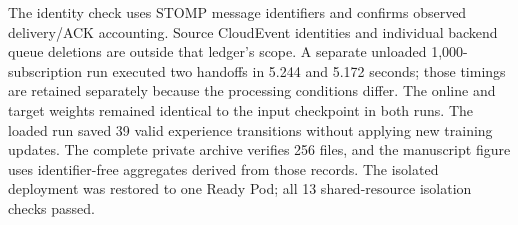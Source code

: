 The identity check uses STOMP message identifiers and confirms observed
delivery/ACK accounting. Source CloudEvent identities and individual backend
queue deletions are outside that ledger's scope. A separate unloaded
1,000-subscription run executed two handoffs in 5.244 and 5.172 seconds;
those timings are retained separately because the processing conditions
differ. The online and target weights remained identical to the input
checkpoint in both runs. The loaded run saved 39 valid experience transitions
without applying new training updates. The complete private archive verifies
256 files, and the manuscript figure uses identifier-free aggregates derived
from those records. The isolated deployment was restored to one Ready Pod;
all 13 shared-resource isolation checks passed.

\FloatBarrier
